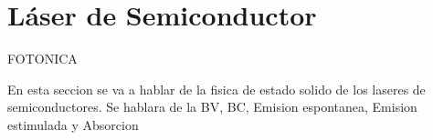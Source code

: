 
\section{Láser de Semiconductor}

	FOTONICA

	En esta seccion se va a hablar de la fisica de estado solido de los laseres de semiconductores. Se hablara de la BV, BC, Emision espontanea, Emision estimulada y Absorcion


